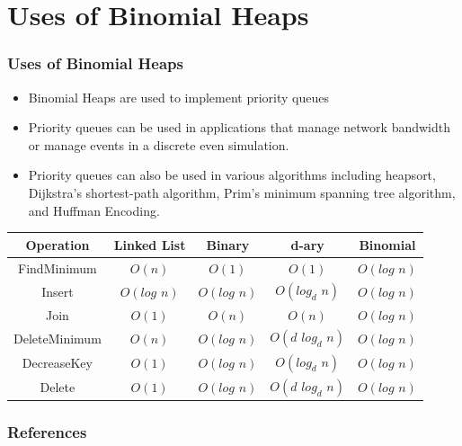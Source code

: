 \documentclass[13pt]{beamer}
\begin{document}
\section{Uses of Binomial Heaps} %
\begin{frame}
\frametitle{Uses of Binomial Heaps}
  \begin{itemize}
    \item Binomial Heaps are used to implement priority queues
    \item Priority queues can be used in applications that manage network bandwidth or manage events in a discrete even simulation.
    \item Priority queues can also be used in various algorithms including heapsort, Dijkstra's shortest-path algorithm, Prim's minimum spanning tree algorithm, and Huffman Encoding.
  \end{itemize}

  \begin{center}
    \begin{tabular}{ | c || c | c | c | c | }
      \hline
      Operation & Linked List & Binary & d-ary & Binomial \\ \hline
      FindMinimum & $O(n)$ & $O(1)$ & $O(1)$ & $O(\textit{log n})$ \\ \hline
      Insert & $O(\textit{log n})$ & $O(\textit{log n})$ & $O(log_d \textit{ n})$ & $O(\textit{log n})$ \\ \hline
      Join & $O(1)$ & $O(n)$ & $O(n)$ & $O(\textit{log n})$ \\ \hline
      DeleteMinimum & $O(n)$ & $O(\textit{log n})$ & $O(\textit{d }log_d \textit{ n})$ & $O(\textit{log n})$ \\ \hline
      DecreaseKey & $O(1)$ & $O(\textit{log n})$ & $O(log_d \textit{ n})$ & $O(\textit{log n})$ \\ \hline
      Delete & $O(1)$ & $O(\textit{log n})$ & $O(\textit{d }log_d \textit{ n})$ & $O(\textit{log n})$ \\ \hline
      \hline
    \end{tabular}
\end{center}
\end{frame}

 \begin{frame}
  \frametitle{References}
  \nocite{*} 
  
\end{frame}
\end{document}
